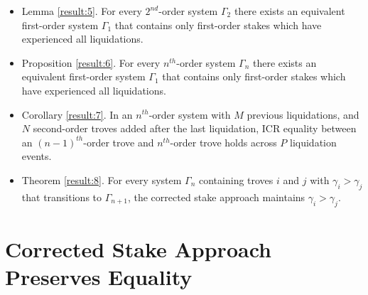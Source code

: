 \documentclass[reqno]{article}
\begin{document}
\begin{itemize}
  \item Lemma \ref{result:5}. For every $2^{nd}$-order system $\Gamma_2$ there exists an equivalent first-order system $\Gamma_1$ that contains only first-order stakes which have experienced all liquidations.

  \item Proposition \ref{result:6}. For every $n^{th}$-order system $\Gamma_n$ there exists an equivalent first-order system $\Gamma_1$ that contains only first-order stakes which have experienced all liquidations.

  \item Corollary \ref{result:7}. In an $n^{th}$-order system with $M$ previous liquidations, and $N$ second-order troves added after the last liquidation, ICR equality between an $(n-1)^{th}$-order trove and $n^{th}$-order trove holds across $P$ liquidation events.

  \item Theorem \ref{result:8}. For every system $\Gamma_n$ containing troves $i$ and $j$ with $\gamma_i > \gamma_j$ that transitions to $\Gamma_{n+1}$, the corrected stake approach maintains $\gamma_i > \gamma_j$.
\end{itemize}


\section{Corrected Stake Approach Preserves Equality}




\end{document}
